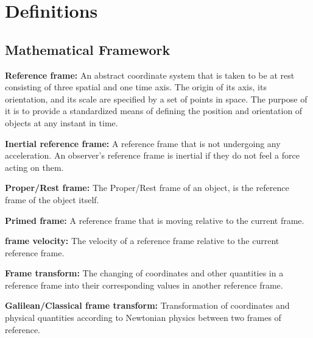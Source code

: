 
\section{Definitions}

\subsection{Mathematical Framework}%

\noindent \hypertarget{def-Reference-frame}{\textbf{Reference frame:}}
An abstract coordinate system that is taken to be at rest consisting of three spatial and one time axis. The origin of its axis, its orientation, and its scale are specified by a set of points in space. The purpose of it is to provide a standardized means of defining the position and orientation of objects at any instant in time.

\noindent \hypertarget{def-Inertial-reference-frame}{\textbf{Inertial reference frame:}}
A reference frame that is not undergoing any acceleration. An observer's reference frame is inertial if they do not feel a force acting on them.

\noindent \hypertarget{def-proper-frame}{\textbf{Proper/Rest frame:}}
The Proper/Rest frame of an object, is the reference frame of the object itself.


\noindent \hypertarget{def-Primed-Frame}{\textbf{Primed frame:}}
A reference frame that is moving relative to the current frame.

\noindent \hypertarget{def-frame-velocity}{\textbf{frame velocity:}}
The velocity of a reference frame relative to the current reference frame.

\noindent \hypertarget{def-transform}{\textbf{Frame transform:}}
The changing of coordinates and other quantities in a reference frame into their corresponding values in another reference frame.

\noindent \hypertarget{def-galilean-transform}{\textbf{Galilean/Classical frame transform:}}
Transformation of coordinates and physical quantities according to Newtonian physics between two frames of reference.

